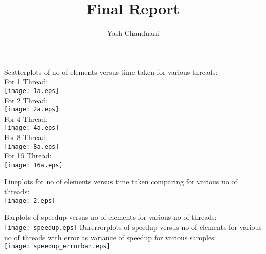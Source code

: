 \documentclass{article}
\title{Final Report}
\author{Yash Chandnani}
\begin{document}
\maketitle
Scatterplots of no of elements versus time taken for various threads:\\
For 1 Thread:\\
\texttt{[image: 1a.eps]}\\
\newpage
For 2 Thread:\\
\texttt{[image: 2a.eps]}\\
\newpage
For 4 Thread:\\
\texttt{[image: 4a.eps]}\\
\newpage
For 8 Thread:\\
\texttt{[image: 8a.eps]}\\
\newpage
For 16 Thread:\\
\texttt{[image: 16a.eps]}\\
\newpage

Lineplots for no of elements versus time taken comparing for various no of  threads:\\
\texttt{[image: 2.eps]}
\newpage

Barplots of speedup versus no of elements for various no of threads:\\
\texttt{[image: speedup.eps]}
\newpage
Barerrorplots of speedup versus no of elements for various no of threads with error as variance of speedup for various samples:\\
\texttt{[image: speedup\_errorbar.eps]}
\newpage
 
\end{document}
